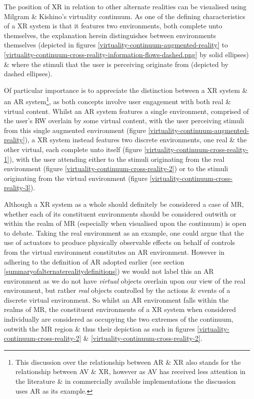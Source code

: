\newcommand{\avxrfootnote}{\footnote{This discussion over the relationship between AR \& XR also stands for the relationship between AV \& XR, however as AV has received less attention in the literature \& in commercially available implementations the discussion uses AR as its example.}}

The position of XR in relation to other alternate realities can be visualised using Milgram \& Kishino's virtuality continuum. As one of the defining characteristics of a XR system is that it features two environments, both complete unto themselves, the explanation herein distinguishes between environments themselves (depicted in figures \ref{virtuality-continuum-augmented-reality} to \ref{virtuality-continuum-cross-reality-information-flows-dashed.png} by solid ellipses) \& where the stimuli that the user is perceiving originate from (depicted by dashed ellipses).


Of particular importance is to appreciate the distinction between a XR system \& an AR system\avxrfootnote{}, as both concepts involve user engagement with both real \& virtual content. Whilst an AR system features a single environment, comprised of the user's RW overlain by some virtual content, with the user perceiving stimuli from this single augmented environment (figure \ref{virtuality-continuum-augmented-reality}), a XR system instead features two discrete environments, one real \& the other virtual, each complete unto itself (figure \ref{virtuality-continuum-cross-reality-1}), with the user attending either to the stimuli originating from the real environment (figure \ref{virtuality-continuum-cross-reality-2}) or to the stimuli originating from the virtual environment (figure \ref{virtuality-continuum-cross-reality-3}).

Although a XR system as a whole should definitely be considered a case of MR, whether each of its constituent environments should be considered outwith or within the realm of MR (especially when visualised upon the continuum) is open to debate. Taking the real environment as an example, one could argue that the use of actuators to produce physically observable effects on behalf of controls from the virtual environment constitutes an AR environment. However in adhering to the definition of AR adopted earlier (see section \ref{summaryofalternaterealitydefinitions}) we would not label this an AR environment as we do not have \textit{virtual} objects overlain upon our view of the real environment, but rather \textit{real} objects controlled by the actions \& events of a discrete virtual environment. So whilst an AR environment falls within the realms of MR, the constituent environments of a XR system when considered individually are considered as occupying the two extremes of the continuum, outwith the MR region \& thus their depiction as such in figures \ref{virtuality-continuum-cross-reality-2} \& \ref{virtuality-continuum-cross-reality-2}.

